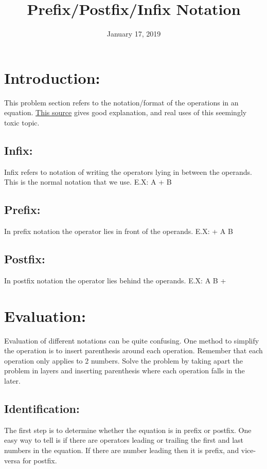 \documentclass{pset_template}
\title{Prefix/Postfix/Infix Notation}
\date{January 17, 2019}
\begin{document}
\maketitle

\section{Introduction:}
This problem section refers to the notation/format of the operations in an equation.
\href{http://interactivepython.org/runestone/static/pythonds/BasicDS/InfixPrefixandPostfixExpressions.html}{This source} gives good explanation, and real uses of this seemingly toxic topic.

\subsection{Infix:}
Infix refers to notation of writing the operators lying in between the operands. This is the normal notation that we use. E.X: A + B

\subsection{Prefix:}
In prefix notation the operator lies in front of the operands. E.X: + A B

\subsection{Postfix:}
In postfix notation the operator lies behind the operands. E.X: A B +

\section{Evaluation:}
Evaluation of different notations can be quite confusing. One method to simplify the operation is to insert parenthesis around each operation. Remember that each operation only applies to 2 numbers. Solve the problem by taking apart the problem in layers and inserting parenthesis where each operation falls in the later.

\subsection{Identification:}
The first step is to determine whether the equation is in prefix or postfix. One easy way to tell is if there are operators leading or trailing the first and last numbers in the equation. If there are number leading then it is prefix, and vice-versa for postfix.
\end{document}
